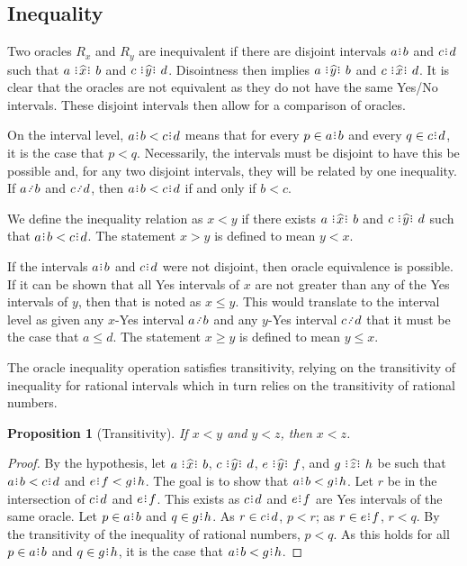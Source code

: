 \documentclass[12pt]{article}
\newtheorem{proposition}{Proposition}[section]
\begin{document}
\subsection{Inequality}

Two oracles $R_x$ and $R_y$ are inequivalent if there are disjoint intervals $a\rint b$ and $c\rint d$ such that $a \xora b$ and $c \xora[y] d$. Disointness then implies \sout{$a \xora[y] b$} and \sout{$c \xora d$}. It is clear that the oracles are not equivalent as they do not have the same Yes/No intervals. These disjoint intervals then allow for a comparison of oracles. 

On the interval level, $a\rint b < c\rint d$ means that for every $p \in a\rint b$ and every $q \in c\rint d$, it is the case that $p < q$. Necessarily, the intervals must be disjoint to have this be possible and, for any two disjoint intervals, they will be related by one inequality. If $a \lte b$ and $c \lte d$, then $a \rint b < c \rint d$ if and only if $b < c$. 

We define the inequality relation as $x < y$ if there exists $a \xora b$ and $c \xora[y] d$ such that $a\rint b<c\rint d$. The statement $x > y$ is defined to mean $y < x$.

If the intervals $a\rint b$ and $c\rint d$ were not disjoint, then oracle equivalence is possible. If it can be shown that all Yes intervals of $x$ are not greater than any of the Yes intervals of $y$, then that is noted as $x \leq y$. This would translate to the interval level as given any $x$-Yes interval $a \lte b$ and any $y$-Yes interval $c \lte d$ that it must be the case that $a \leq d$. The statement $x \geq y$ is defined to mean $y \leq x$.

The oracle inequality operation satisfies transitivity, relying on the transitivity of inequality for rational intervals which in turn relies on the transitivity of rational numbers. 

\begin{proposition}[Transitivity]
    If $x <y$ and $y<z$, then $x < z$.
\end{proposition}

\begin{proof}
    By the hypothesis, let $a \xora b$, $c \xora[y] d$, $e \xora[y] f$, and $g \xora[z] h$ be such that $a\rint b < c\rint d$ and $e\rint f < g\rint h$. The goal is to show that $a\rint b < g\rint h$. Let $r$ be in the intersection of $c\rint d$ and $e\rint f$. This exists as $c\rint d$ and $e\rint f$ are Yes intervals of the same oracle. Let $p \in a\rint b$ and $q \in g\rint h$. As $r \in c\rint d$, $p < r$; as $r \in e\rint f$, $r < q$. By the transitivity of the inequality of rational numbers, $p < q$. As this holds for all $p \in a\rint b$ and $q \in g\rint h$, it is the case that $a\rint b <g\rint h$.
\end{proof}
\end{document}
